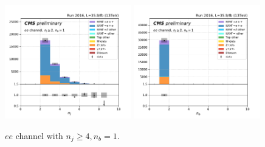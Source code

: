 \begin{figure}[ht]
    \includegraphics[width=0.49\textwidth]{chapters/Analysis/sectionPlots/figures/kinematics_pickles/ee/1b/ee_1b_nJets.pdf}
    \includegraphics[width=0.49\textwidth]{chapters/Analysis/sectionPlots/figures/kinematics_pickles/ee/1b/ee_1b_nBJets.pdf}
    
    \caption{$ee$ channel with $n_j\geq4, n_b=1$.}
\end{figure}

